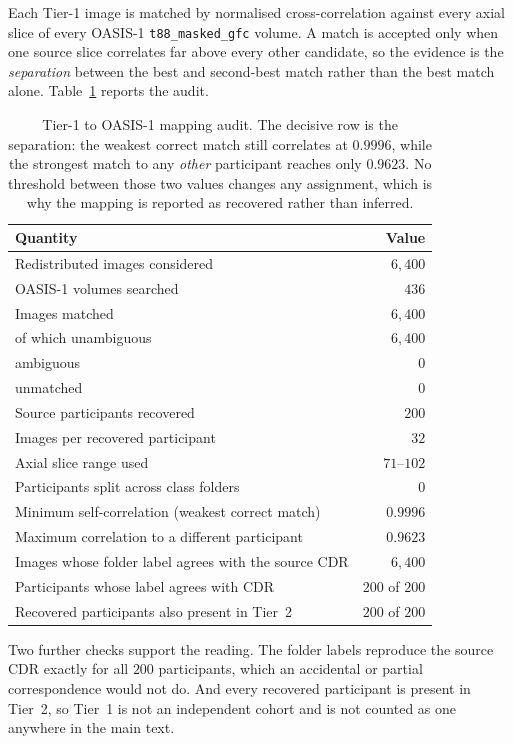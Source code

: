 \documentclass[11pt]{article}
\begin{document}
Each Tier-1 image is matched by normalised cross-correlation against every
axial slice of every OASIS-1 \texttt{t88\_masked\_gfc} volume. A match is
accepted only when one source slice correlates far above every other
candidate, so the evidence is the \emph{separation} between the best and
second-best match rather than the best match alone.
Table~\ref{tab:sm_tier1_forensics} reports the audit.

\begin{table}[!ht]
\centering
\small
\caption{Tier-1 to OASIS-1 mapping audit. The decisive row is the
separation: the weakest correct match still correlates at $0.9996$, while
the strongest match to any \emph{other} participant reaches only $0.9623$.
No threshold between those two values changes any assignment, which is why
the mapping is reported as recovered rather than inferred.}
\label{tab:sm_tier1_forensics}
\begin{tabular}{@{}lr@{}}
\toprule
\textbf{Quantity} & \textbf{Value} \\
\midrule
Redistributed images considered & $6{,}400$ \\
OASIS-1 volumes searched & $436$ \\
Images matched & $6{,}400$ \\
\quad of which unambiguous & $6{,}400$ \\
\quad ambiguous & $0$ \\
\quad unmatched & $0$ \\
\midrule
Source participants recovered & $200$ \\
Images per recovered participant & $32$ \\
Axial slice range used & $71$--$102$ \\
Participants split across class folders & $0$ \\
\midrule
Minimum self-correlation (weakest correct match) & $0.9996$ \\
Maximum correlation to a different participant & $0.9623$ \\
\midrule
Images whose folder label agrees with the source CDR & $6{,}400$ \\
Participants whose label agrees with CDR & $200$ of $200$ \\
Recovered participants also present in Tier~2 & $200$ of $200$ \\
\bottomrule
\end{tabular}
\end{table}

\noindent
Two further checks support the reading. The folder labels reproduce the
source CDR exactly for all $200$ participants, which an accidental or
partial correspondence would not do. And every recovered participant is
present in Tier~2, so Tier~1 is not an independent cohort and is not
counted as one anywhere in the main text.
\end{document}
